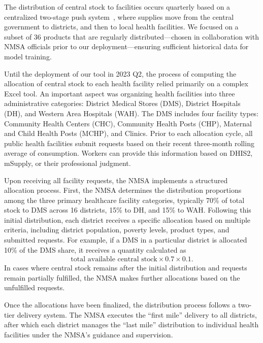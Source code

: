\documentclass[12pt]{article}
\begin{document}
The distribution of central stock to facilities occurs quarterly based on a centralized two-stage push system~\cite{terwiesch2006matching}, where supplies move from the central government to districts, and then to local health facilities. We focused on a subset of 36 products that are regularly distributed---chosen in collaboration with NMSA officials prior to our deployment---ensuring sufficient historical data for model training.

Until the deployment of our tool in 2023 Q2, the process of computing the allocation of central stock to each health facility relied primarily on a complex Excel tool. An important aspect was organizing health facilities into three administrative categories: District Medical Stores (DMS), District Hospitals (DH), and Western Area Hospitals (WAH). The DMS includes four facility types: Community Health Centers (CHC), Community Health Posts (CHP), Maternal and Child Health Posts (MCHP), and Clinics. Prior to each allocation cycle, all public health facilities submit requests based on their recent three-month rolling average of consumption. Workers can provide this information based on DHIS2, mSupply, or their professional judgment.

Upon receiving all facility requests, the NMSA implements a structured allocation process. First, the NMSA determines the distribution proportions among the three primary healthcare facility categories, typically 70\% of total stock to DMS across 16 districts, 15\% to DH, and 15\% to WAH. Following this initial distribution, each district receives a specific allocation based on multiple criteria, including district population, poverty levels, product types, and submitted requests. For example, if a DMS in a particular district is allocated 10\% of the DMS share, it receives a quantity calculated as
\begin{align*}
\text{total available central stock} \times 0.7 \times 0.1.
\end{align*}
In cases where central stock remains after the initial distribution and requests remain partially fulfilled, the NMSA makes further allocations based on the unfulfilled requests.

Once the allocations have been finalized, the distribution process follows a two-tier delivery system. The NMSA executes the ``first mile'' delivery to all districts, after which each district manages the ``last mile'' distribution to individual health facilities under the NMSA's guidance and supervision.
\end{document}
